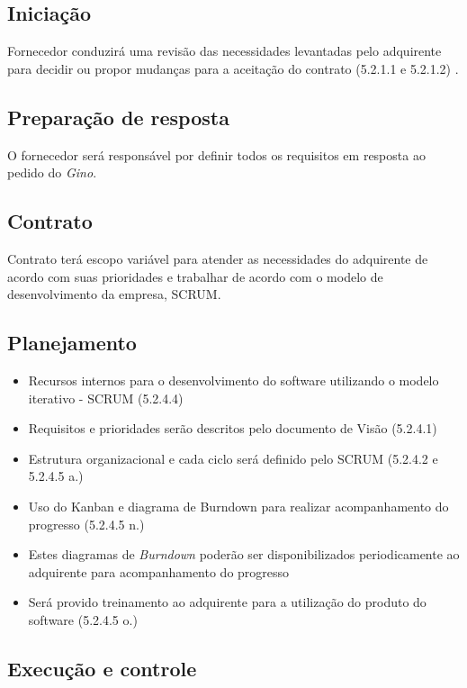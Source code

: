 \subsection{Iniciação}

Fornecedor conduzirá uma revisão das necessidades levantadas pelo adquirente para decidir ou propor mudanças para a aceitação do contrato (5.2.1.1 e 5.2.1.2) \cite{iso12207:95}.

\subsection{Preparação de resposta}

O fornecedor será responsável por definir todos os requisitos em resposta ao pedido do \textit{Gino}.

\subsection{Contrato}

Contrato terá escopo variável para atender as necessidades do adquirente de acordo com suas prioridades e trabalhar de acordo com o modelo de desenvolvimento da empresa, SCRUM.

\subsection{Planejamento}

\begin{itemize}
  \item Recursos internos para o desenvolvimento do software utilizando o modelo iterativo - SCRUM (5.2.4.4)
  \item Requisitos e prioridades serão descritos pelo documento de Visão (5.2.4.1)
  \item Estrutura organizacional e cada ciclo será definido pelo SCRUM (5.2.4.2 e 5.2.4.5 a.)
  \item Uso do Kanban e diagrama de Burndown para realizar acompanhamento do progresso (5.2.4.5 n.)
  \item Estes diagramas de \textit{Burndown} poderão ser disponibilizados periodicamente ao adquirente para acompanhamento do progresso
  \item Será provido treinamento ao adquirente para a utilização do produto do software (5.2.4.5 o.)
\end{itemize}

\subsection{Execução e controle}


